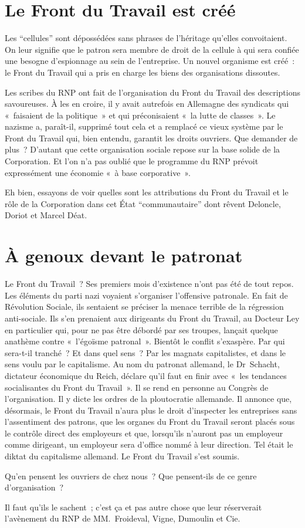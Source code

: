 \documentclass[french,twoside]{book} %
\begin{document}
\section[{Le Front du Travail est créé}]{Le Front du Travail est créé}
\noindent Les “cellules” sont dépossédées sans phrases de l’héritage qu’elles convoitaient. On leur signifie que le patron sera membre de droit de la cellule à qui sera confiée une besogne d’espionnage au sein de l’entreprise. Un nouvel organisme est créé : le Front du Travail qui a pris en charge les biens des organisations dissoutes.\par
Les scribes du RNP ont fait de l’organisation du Front du Travail des descriptions savoureuses. À les en croire, il y avait autrefois en Allemagne des syndicats qui « faisaient de la politique » et qui préconisaient « la lutte de classes ». Le nazisme a, paraît-il, supprimé tout cela et a remplacé ce vieux système par le Front du Travail qui, bien entendu, garantit les droits ouvriers. Que demander de plus ? D’autant que cette organisation sociale repose sur la base solide de la Corporation. Et l’on n’a pas oublié que le programme du RNP prévoit expressément une économie « à base corporative ».\par
Eh bien, essayons de voir quelles sont les attributions du Front du Travail et le rôle de la Corporation dans cet État “communautaire” dont rêvent Deloncle, Doriot et Marcel Déat.
\section[{À genoux devant le patronat}]{À genoux devant le patronat}
\noindent Le Front du Travail ? Ses premiers mois d’existence n’ont pas été de tout repos. Les éléments du parti nazi voyaient s’organiser l’offensive patronale. En fait de Révolution Sociale, ils sentaient se préciser la menace terrible de la régression anti-sociale. Ils s’en prenaient aux dirigeants du Front du Travail, au Docteur Ley en particulier qui, pour ne pas être débordé par ses troupes, lançait quelque anathème contre « l’égoïsme patronal ». Bientôt le conflit s’exaspère. Par qui sera-t-il tranché ? Et dans quel sens ? Par les magnats capitalistes, et dans le sens voulu par le capitalisme. Au nom du patronat allemand, le Dr Schacht, dictateur économique du Reich, déclare qu’il faut en finir avec « les tendances socialisantes du Front du Travail ». Il se rend en personne au Congrès de l’organisation. Il y dicte les ordres de la ploutocratie allemande. Il annonce que, désormais, le Front du Travail n’aura plus le droit d’inspecter les entreprises sans l’assentiment des patrons, que les organes du Front du Travail seront placés sous le contrôle direct des employeurs et que, lorsqu’ils n’auront pas un employeur comme dirigeant, un employeur sera d’office nommé à leur direction. Tel était le diktat du capitalisme allemand. Le Front du Travail s’est soumis.\par
Qu’en pensent les ouvriers de chez nous ? Que pensent-ils de ce genre d’organisation ?\par
Il faut qu’ils le sachent ; c’est ça et pas autre chose que leur réserverait l’avènement du RNP de MM. Froideval, Vigne, Dumoulin et Cie.
\end{document}
